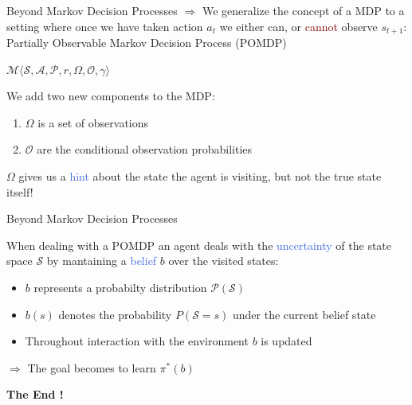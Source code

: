 \documentclass{beamer}
\begin{document}
\begin{frame}{Beyond Markov Decision Processes}
	$\Rightarrow$ We \textcolor{skymagenta}{generalize} the concept of a MDP to a setting where once we have taken action $a_t$ we either can, or \textcolor{Maroon}{cannot} observe $s_{t+1}$: Partially Observable Markov Decision Process (POMDP)

	\begin{center}
		$\mathcal{M}\langle \mathcal{S}, \mathcal{A}, \mathcal{P}, r, \Omega, \mathcal{O}, \gamma \rangle$
	\end{center}


	We add two new components to the MDP:
	\begin{enumerate}
		\item $\Omega$ is a set of observations
		\item $\mathcal{O}$ are the conditional observation probabilities
	\end{enumerate}

	$\Omega$ gives us a \textcolor{RoyalBlue}{hint} about the state the agent is visiting, but not the true state itself!

\end{frame}

\begin{frame}{Beyond Markov Decision Processes}
	
	When dealing with a POMDP an agent deals with the \textcolor{RoyalBlue}{uncertainty} of the state space $\mathcal{S}$ by mantaining a \textcolor{RoyalBlue}{belief} $b$ over the visited states:
	\begin{itemize}
		\item $b$ represents a probabilty distribution $\mathcal{P}(\mathcal{S})$
		\item $b(s)$ denotes the probability $P(\mathcal{S}=s)$ under the current belief state
		\item Throughout interaction with the environment $b$ is updated
	\end{itemize}

	\bigskip

	$\Rightarrow$ The \textcolor{skymagenta}{goal} becomes to learn $\pi^{*}(b)$

\end{frame}

\begin{frame}
	\begin{center}
		\textcolor{skymagenta}{\textbf{The End !}}
	\end{center}
\end{frame}
\end{document}
